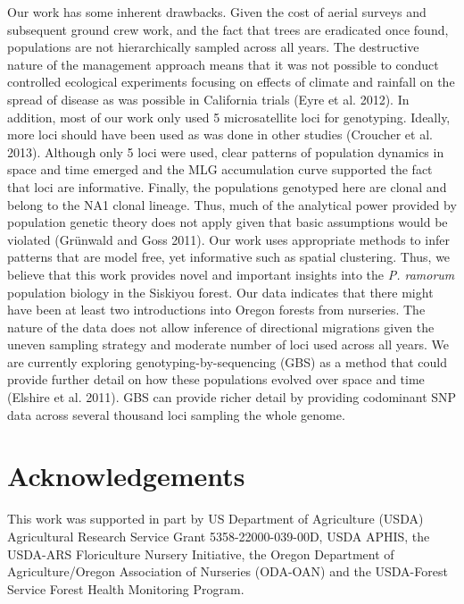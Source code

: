 \documentclass[double,12pt]{beavtex}
\begin{document}
  Our work has some inherent drawbacks. Given the cost of aerial surveys
  and subsequent ground crew work, and the fact that trees are eradicated
  once found, populations are not hierarchically sampled across all years.
  The destructive nature of the management approach means that it was not
  possible to conduct controlled ecological experiments focusing on
  effects of climate and rainfall on the spread of disease as was possible
  in California trials (Eyre et al. 2012). In addition, most of our work
  only used 5 microsatellite loci for genotyping. Ideally, more loci
  should have been used as was done in other studies (Croucher et al.
  2013). Although only 5 loci were used, clear patterns of population
  dynamics in space and time emerged and the MLG accumulation curve
  supported the fact that loci are informative. Finally, the populations
  genotyped here are clonal and belong to the NA1 clonal lineage. Thus,
  much of the analytical power provided by population genetic theory does
  not apply given that basic assumptions would be violated (Grünwald and
  Goss 2011). Our work uses appropriate methods to infer patterns that are
  model free, yet informative such as spatial clustering. Thus, we believe
  that this work provides novel and important insights into the \emph{P.
  ramorum} population biology in the Siskiyou forest. Our data indicates
  that there might have been at least two introductions into Oregon
  forests from nurseries. The nature of the data does not allow inference
  of directional migrations given the uneven sampling strategy and
  moderate number of loci used across all years. We are currently
  exploring genotyping-by-sequencing (GBS) as a method that could provide
  further detail on how these populations evolved over space and time
  (Elshire et al. 2011). GBS can provide richer detail by providing
  codominant SNP data across several thousand loci sampling the whole
  genome.
  
  \section{Acknowledgements}\label{acknowledgements}
  
  This work was supported in part by US Department of Agriculture (USDA)
  Agricultural Research Service Grant 5358-22000-039-00D, USDA APHIS, the
  USDA-ARS Floriculture Nursery Initiative, the Oregon Department of
  Agriculture/Oregon Association of Nurseries (ODA-OAN) and the
  USDA-Forest Service Forest Health Monitoring Program.
  
\end{document}
